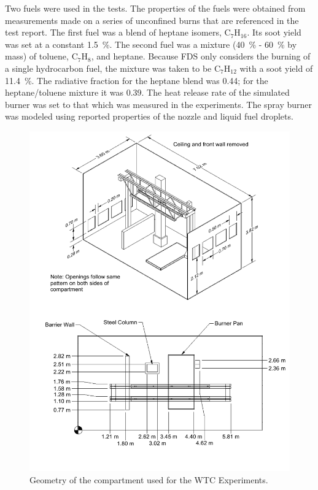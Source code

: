 Two fuels were used in the tests. The properties of the fuels were obtained from measurements made on a series of unconfined burns that are referenced in the test report. The first fuel was a blend of heptane isomers, C$_7$H$_{16}$. Its soot yield was set at a constant 1.5~\%. The second fuel was a mixture (40~\% - 60~\% by mass) of toluene, C$_7$H$_8$, and heptane. Because FDS only considers the burning of a single hydrocarbon fuel, the mixture was taken to be C$_7$H$_{12}$ with a soot yield of 11.4~\%. The radiative fraction for the heptane blend was 0.44; for the heptane/toluene mixture it was 0.39. The heat release rate of the simulated burner was set to that which was measured in the experiments. The spray burner was modeled using reported properties of the nozzle and liquid fuel droplets.

\begin{figure}[p]
\begin{center}
\includegraphics[width=\textwidth]{FIGURES/WTC/WTC}
\end{center}
\caption[Geometry of the WTC Experiments]{Geometry of the compartment used for the WTC Experiments.}
\label{WTC_Drawing}
\end{figure}

